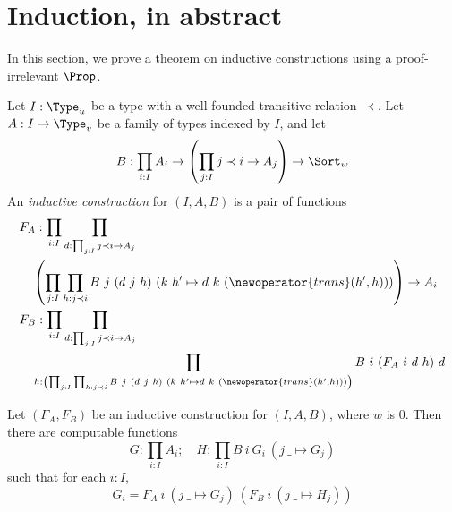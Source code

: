 \section{Induction, in abstract}
In this section, we prove a theorem on inductive constructions using a proof-irrelevant \( \Prop \).
\begin{definition}
  \label{def:IC}
  Let \( I : \Type_u \) be a type with a well-founded transitive relation \( \prec \).
  Let \( A : I \to \Type_v \) be a family of types indexed by \( I \), and let
  \[ B : \prod_{i : I} A_i \to \left(\prod_{j : I} j \prec i \to A_j\right) \to \Sort_w \]
  An \emph{inductive construction} for \( (I, A, B) \) is a pair of functions
  \begin{align*}
    &F_A : \prod_{i : I} \prod_{d : \prod_{j : I} j \prec i \to A_j} \\
    &\quad\left( \prod_{j : I} \prod_{h : j \prec i} B\ j\ (d\ j\ h)\ (k\ h' \mapsto d\ k\ (\newoperator{trans}(h',h))) \right) \to A_i \\
    &F_B : \prod_{i : I} \prod_{d : \prod_{j : I} j \prec i \to A_j} \\
    &\quad\prod_{h : \left( \prod_{j : I} \prod_{h : j \prec i} B\ j\ (d\ j\ h)\ (k\ h' \mapsto d\ k\ (\newoperator{trans}(h',h))) \right)} B\ i\ (F_A\ i\ d\ h)\ d
  \end{align*}
\end{definition}
\begin{proposition}
  \label{prop:IC.fix_prop}
  Let \( (F_A, F_B) \) be an inductive construction for \( (I, A, B) \), where \( w \) is \( 0 \).
  Then there are computable functions
  \[ G : \prod_{i : I} A_i;\quad H : \prod_{i : I} B\ i\ G_i\ (j\ \_ \mapsto G_j) \]
  such that for each \( i : I \),
  \[ G_i = F_A\ i\ (j\ \_ \mapsto G_j)\ (F_B\ i\ (j\ \_ \mapsto H_j)) \]
\end{proposition}
